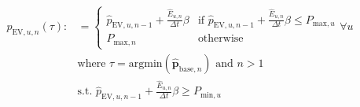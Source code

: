 \begin{equation}
\begin{split}
	p_{\text{EV},u,n}(\tau) :&=
	\begin{cases}
		\hat{p}_{\text{EV},u,n-1} + \frac{\hat{E}_{u,n}}{\Delta t}\beta &\text{if } \hat{p}_{\text{EV},u,n-1} + \frac{\hat{E}_{u,n}}{\Delta t}\beta \leq P_{\text{max},u}\\
		P_{\text{max},n} &\text{otherwise}
 	\end{cases}
 	\forall u  \\
 	&\text{where } \tau = \text{argmin}(\hat{\textbf{p}}_{\text{base},n}) \text{ and } n > 1\\
 	&\text{s.t. } \hat{p}_{\text{EV},u,n-1} + \frac{\hat{E}_{u,n}}{\Delta t}\beta \geq P_{\text{min},u}
\end{split}
\label{ch3:equ:valley-filling-equation}
\end{equation}
